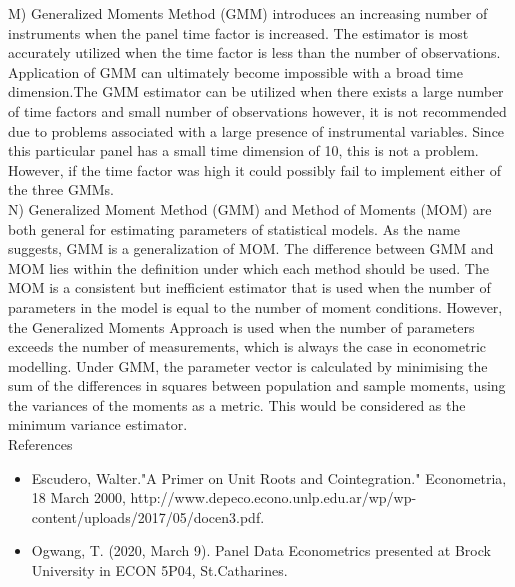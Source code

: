 \documentclass[12pt]{article}
\begin{document}
\break
M) Generalized Moments Method (GMM) introduces an increasing number of instruments when the panel time factor is increased. The estimator is most accurately utilized when the time factor is less than the number of observations. Application of GMM can ultimately become impossible with a broad time dimension.The GMM estimator can be utilized when there exists a large number of time factors and small number of observations however, it is not recommended due to problems associated with a large presence of instrumental variables. Since this particular panel has a small time dimension of 10, this is not a problem. However, if the time factor was high it could possibly fail to implement either of the three GMMs.\\
\break
N) Generalized Moment Method (GMM) and Method of Moments (MOM) are both general for estimating parameters of statistical models. As the name suggests, GMM is a generalization of MOM. The difference between GMM and MOM lies within the definition under which each method should be used. The MOM is a consistent but inefficient estimator that is used when the number of parameters in the model is equal to the number of moment conditions. However, the Generalized Moments Approach is used when the number of parameters exceeds the number of measurements, which is always the case in econometric modelling. Under GMM, the parameter vector is calculated by minimising the sum of the differences in squares between population and sample moments, using the variances of the moments as a metric. This would be considered as the minimum variance estimator.\\


\Large{References}
\begin{flushleft}
\begin{itemize}
\small
\item Escudero, Walter."A Primer on Unit Roots and Cointegration." Econometria, 18 March 2000,
\break
 http://www.depeco.econo.unlp.edu.ar/wp/wp-content/uploads/2017/05/docen3.pdf.
\break
\item Ogwang, T. (2020, March 9). Panel Data Econometrics presented at Brock University in ECON 5P04, St.Catharines.
\break
\end{itemize}
\end{flushleft}
\end{document}
